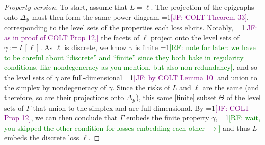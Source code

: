 \documentclass[12pt]{article}
\newcommand{\Comments}{1}
\newcommand{\mynote}[2]{\ifnum\Comments=1\textcolor{#1}{#2}\fi}
\newcommand{\raf}[1]{\mynote{green}{[RF: #1]}}
\newcommand{\jessie}[1]{\mynote{purple}{[JF: #1]}}
\newcommand{\prop}[1]{\Gamma[#1]}
\newcommand{\simplex}{\Delta_\Y}
\newcommand{\Y}{\mathcal{Y}}
\newcommand{\risk}[1]{\underline{#1}}
\DeclareMathOperator*{\argmin}{arg\,min}
\begin{document}
\begin{proof}[Property version]
  To start, assume that $\risk{L} = \risk{\ell}$.
  The projection of the epigraphs onto $\simplex$ must then form the same power diagram \jessie{COLT Theorem 33}, corresponding to the level sets of the properties each loss elicits.
  Notably, \jessie{as in proof of COLT Prop 12,} the facets of $\risk{\ell}$ project onto the level sets of $\gamma := \prop{\ell}$.
  As $\ell$ is discrete, we know $\gamma$ is finite \raf{note for later: we have to be careful about ``discrete'' and ``finite'' since they both bake in regularity conditions, like nondegeneracy as you mention, but also non-redundancy}, and so the level sets of $\gamma$ are full-dimensional \jessie{by COLT Lemma 10} and union to the simplex by nondegeneracy of $\gamma$.
  Since the risks of $L$ and $\ell$ are the same (and therefore, so are their projections onto $\simplex$), this same [finite] subset $\Theta$ of the level sets of $\Gamma$ that union to the simplex and are full-dimensional.
  By \jessie{COLT Prop 12}, we can then conclude that $\Gamma$ embeds the finite property $\gamma$, \raf{wait, you skipped the other condition for losses embedding each other $\rightarrow$} and thus $L$ embeds the discrete loss $\ell$.
   
    
%  
%  
\end{proof}
\hrulefill
\end{document}
